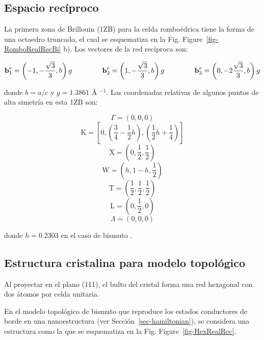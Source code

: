 \documentclass[
  letterpaper,
  DIV=11,
  numbers=noendperiod]{scrreprt}
\begin{document}
\hypertarget{espacio-recuxedproco}{%
\subsection{Espacio recíproco}\label{espacio-recuxedproco}}

La primera zona de Brillouin (1ZB) para la celda romboédrica tiene la
forma de una octaedro truncado, el cual se esquematiza en la Fig.
Figure~\ref{fig-RomboRealRecBi} b). Los vectores de la red recíproca
son:

\[
    \mathbf{b}_1^r = \left ( -1 , - \frac{\sqrt{3}}{3} , b \right )g  \hspace{15mm}
    \mathbf{b}_2^r = \left (  1 , - \frac{\sqrt{3}}{3} , b \right )g  \hspace{15mm} 
    \mathbf{b}_3^r = \left (  0 , -2\frac{\sqrt{3}}{3} , b \right )g  
\]

donde \(b= a/c\) y \(g=1.3861\) Å \(^{-1}\). Las coordenadas relativas
de algunos puntos de alta simetría en esta 1ZB son:

\[
    \Gamma = \left ( 0,0,0 \right )
\] \[
    \mathrm{K} = \left [ 0,\left (\frac{3}{4}-\frac{1}{2} h \right ), \left ( \frac{1}{2} h +\frac{1}{4} \right ) \right ] 
\] \[
    \mathrm{X} = \left ( 0,\frac{1}{2},\frac{1}{2} \right )
\] \[
    \mathrm{W} = \left ( h,1-h,\frac{1}{2} \right )
\] \[
    \mathrm{T} = \left ( \frac{1}{2},\frac{1}{2},\frac{1}{2} \right )
\] \[
    \mathrm{L} = \left ( 0,\frac{1}{2},0 \right )
\] \[
    \Lambda = \left ( 0,0,0 \right )
\]

donde \(h=0.2303\) en el caso de bismuto \cite{Falicov1965}.

\hypertarget{estructura-cristalina-para-modelo-topoluxf3gico}{%
\subsection{Estructura cristalina para modelo
topológico}\label{estructura-cristalina-para-modelo-topoluxf3gico}}

Al proyectar en el plano (111), el bulto del cristal forma una red
hexagonal con dos átomos por celda unitaria.

En el modelo topológico de bismuto \cite{Schindler2018} que reproduce
los estados conductores de borde en una nanoestructura (ver
Sección~\ref{sec-hamiltonian}), se considera una estructura como la que
se esquematiza en la Fig. Figure~\ref{fig-HexRealRec}.
\end{document}
